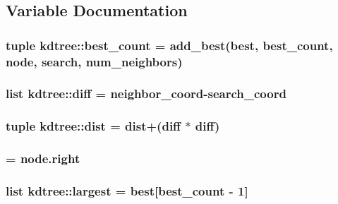 \subsection{Variable Documentation}
\hypertarget{namespacekdtree_a5254def45bf553b4ed113993acde66ec}{
\subsubsection[{best\_\-count}]{\setlength{\rightskip}{0pt plus 5cm}tuple {\bf kdtree::best\_\-count} = add\_\-best(best, {\bf best\_\-count}, node, search, num\_\-neighbors)}}
\label{namespacekdtree_a5254def45bf553b4ed113993acde66ec}
\hypertarget{namespacekdtree_acdecd5b85843a2d9caa9703f3d246c5a}{
\subsubsection[{diff}]{\setlength{\rightskip}{0pt plus 5cm}list {\bf kdtree::diff} = neighbor\_\-coord-\/search\_\-coord}}
\label{namespacekdtree_acdecd5b85843a2d9caa9703f3d246c5a}
\hypertarget{namespacekdtree_ab18cecee0f3d4292dc06665f88c9dcd1}{
\subsubsection[{dist}]{\setlength{\rightskip}{0pt plus 5cm}tuple {\bf kdtree::dist} = {\bf dist}+({\bf diff} $\ast$ {\bf diff})}}
\label{namespacekdtree_ab18cecee0f3d4292dc06665f88c9dcd1}
\hypertarget{namespacekdtree_a1098829259a7546f7778cfe19c86e50c}{
\subsubsection[{far}]{ = node.right}}
\label{namespacekdtree_a1098829259a7546f7778cfe19c86e50c}
\hypertarget{namespacekdtree_a8ae4f604fa3b331f0e1857ef7988dbed}{
\subsubsection[{largest}]{\setlength{\rightskip}{0pt plus 5cm}list {\bf kdtree::largest} = best\mbox{[}{\bf best\_\-count} -\/ 1\mbox{]}}}
